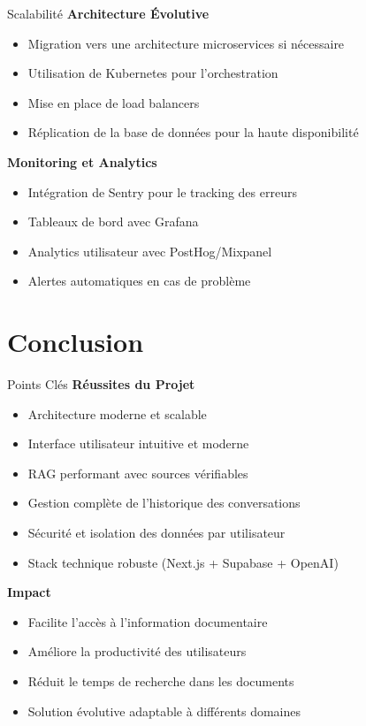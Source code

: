 \documentclass[aspectratio=169]{beamer}
\begin{document}
\begin{frame}{Scalabilité}
    \textbf{Architecture Évolutive}
    \begin{itemize}
        \item Migration vers une architecture microservices si nécessaire
        \item Utilisation de Kubernetes pour l'orchestration
        \item Mise en place de load balancers
        \item Réplication de la base de données pour la haute disponibilité
    \end{itemize}
    
    \vspace{0.5cm}
    
    \textbf{Monitoring et Analytics}
    \begin{itemize}
        \item Intégration de Sentry pour le tracking des erreurs
        \item Tableaux de bord avec Grafana
        \item Analytics utilisateur avec PostHog/Mixpanel
        \item Alertes automatiques en cas de problème
    \end{itemize}
\end{frame}

\section{Conclusion}

\begin{frame}{Points Clés}
    \textbf{Réussites du Projet}
    \begin{itemize}
        \item[\checkmark] Architecture moderne et scalable
        \item[\checkmark] Interface utilisateur intuitive et moderne
        \item[\checkmark] RAG performant avec sources vérifiables
        \item[\checkmark] Gestion complète de l'historique des conversations
        \item[\checkmark] Sécurité et isolation des données par utilisateur
        \item[\checkmark] Stack technique robuste (Next.js + Supabase + OpenAI)
    \end{itemize}
    
    \vspace{0.5cm}
    
    \textbf{Impact}
    \begin{itemize}
        \item Facilite l'accès à l'information documentaire
        \item Améliore la productivité des utilisateurs
        \item Réduit le temps de recherche dans les documents
        \item Solution évolutive adaptable à différents domaines
    \end{itemize}
\end{frame}
\end{document}
